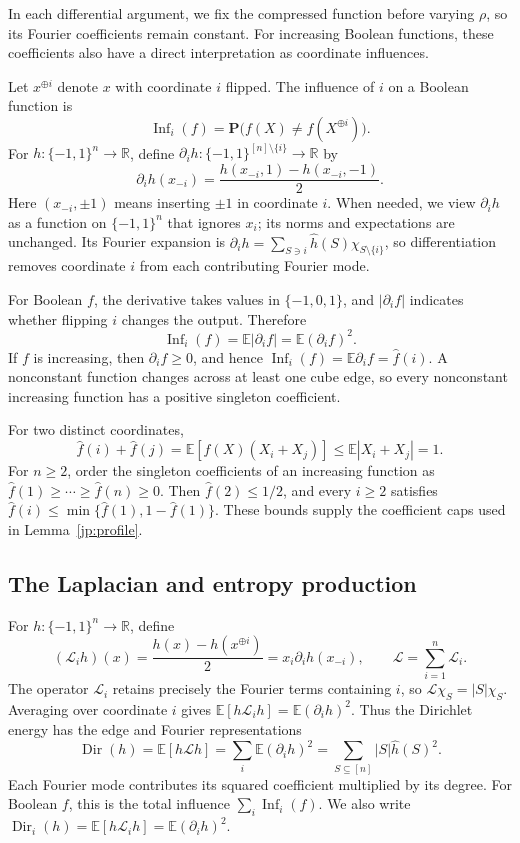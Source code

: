 \documentclass[11pt,letterpaper]{amsart}
\newcommand{\E}{\mathbb E}
\newcommand{\R}{\mathbb R}
\newcommand{\PP}{\mathbf P}
\newcommand{\1}{\mathbf 1}
\numberwithin{equation}{section}
\begin{document}
In each differential argument, we fix the compressed function before
varying $\rho$, so its Fourier coefficients remain constant.
For increasing Boolean functions, these coefficients also have
a direct interpretation as coordinate influences.

Let $x^{\oplus i}$ denote $x$ with coordinate $i$ flipped.
The influence of $i$ on a Boolean function is
\[
 \operatorname{Inf}_i(f)
 =\PP\bigl(f(X)\ne f(X^{\oplus i})\bigr).
\]
For $h:\{-1,1\}^n\to\R$, define
$\partial_i h:\{-1,1\}^{[n]\setminus\{i\}}\to\R$ by
\[
 \partial_i h(x_{-i})
 =\frac{h(x_{-i},1)-h(x_{-i},-1)}2.
\]
Here $(x_{-i},\pm1)$ means inserting $\pm1$ in coordinate $i$.
When needed, we view $\partial_i h$ as a function on
$\{-1,1\}^n$ that ignores $x_i$; its norms and expectations
are unchanged.
Its Fourier expansion is
$\partial_i h=\sum_{S\ni i}\widehat h(S)\chi_{S\setminus\{i\}}$,
so differentiation removes coordinate $i$ from each contributing
Fourier mode.

For Boolean $f$, the derivative takes values in $\{-1,0,1\}$,
and $|\partial_i f|$ indicates whether flipping $i$ changes
the output. Therefore
\[
 \operatorname{Inf}_i(f)
 =\E|\partial_i f|=\E(\partial_i f)^2.
\]
If $f$ is increasing, then $\partial_i f\ge0$, and hence
$\operatorname{Inf}_i(f)=\E\partial_i f=\widehat f(i)$.
A nonconstant function changes across at least one cube edge,
so every nonconstant increasing function has a positive singleton
coefficient.

For two distinct coordinates,
\begin{equation}\label{eq:pair-bound}
 \widehat f(i)+\widehat f(j)
 =\E[f(X)(X_i+X_j)]
 \le\E|X_i+X_j|=1.
\end{equation}
For $n\ge2$, order the singleton coefficients of an increasing
function as $\widehat f(1)\ge\cdots\ge\widehat f(n)\ge0$.
Then $\widehat f(2)\le1/2$, and every $i\ge2$ satisfies
$\widehat f(i)\le\min\{\widehat f(1),1-\widehat f(1)\}$.
These bounds supply the coefficient caps used in
Lemma~\ref{jp:profile}.

\subsection{The Laplacian and entropy production}

For $h:\{-1,1\}^n\to\R$, define
\[
 (\mathcal L_i h)(x)
 =\frac{h(x)-h(x^{\oplus i})}{2}
 =x_i\partial_i h(x_{-i}),
 \qquad
 \mathcal L=\sum_{i=1}^n\mathcal L_i.
\]
The operator $\mathcal L_i$ retains precisely the Fourier terms
containing $i$, so $\mathcal L\chi_S=|S|\chi_S$.
Averaging over coordinate $i$ gives
$\E[h\mathcal L_i h]=\E(\partial_i h)^2$.
Thus the Dirichlet energy has the edge and Fourier representations
\begin{equation}\label{eq:dirichlet-energy}
 \operatorname{Dir}(h)
 =\E[h\mathcal Lh]
 =\sum_i\E(\partial_i h)^2
 =\sum_{S\subseteq[n]}|S|\widehat h(S)^2.
\end{equation}
Each Fourier mode contributes its squared coefficient multiplied
by its degree. For Boolean $f$, this is the total influence
$\sum_i\operatorname{Inf}_i(f)$.
We also write
$\operatorname{Dir}_i(h)=\E[h\mathcal L_i h]
=\E(\partial_i h)^2$.
\end{document}
